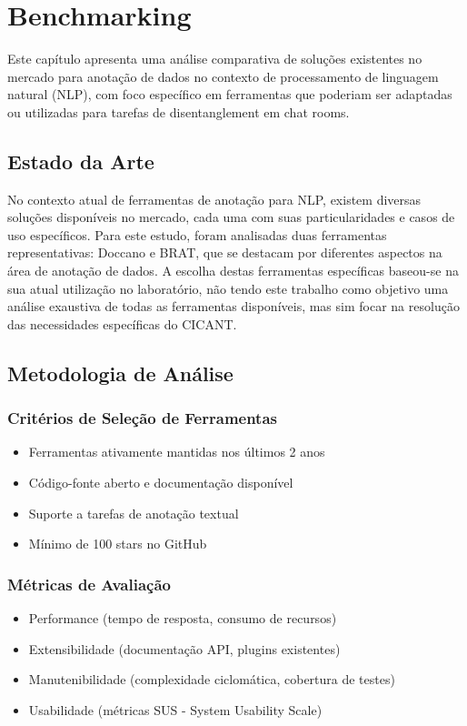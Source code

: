 \chapter{Benchmarking}

Este capítulo apresenta uma análise comparativa de soluções existentes no mercado para anotação de dados no contexto de processamento de linguagem natural (NLP), com foco específico em ferramentas que poderiam ser adaptadas ou utilizadas para tarefas de disentanglement em chat rooms.

\section{Estado da Arte}

No contexto atual de ferramentas de anotação para NLP, existem diversas soluções disponíveis no mercado, cada uma com suas particularidades e casos de uso específicos. Para este estudo, foram analisadas duas ferramentas representativas: Doccano e BRAT, que se destacam por diferentes aspectos na área de anotação de dados. A escolha destas ferramentas específicas baseou-se na sua atual utilização no laboratório, não tendo este trabalho como objetivo uma análise exaustiva de todas as ferramentas disponíveis, mas sim focar na resolução das necessidades específicas do CICANT.

\section{Metodologia de Análise}

\subsection{Critérios de Seleção de Ferramentas}
\begin{itemize}
    \item Ferramentas ativamente mantidas nos últimos 2 anos
    \item Código-fonte aberto e documentação disponível
    \item Suporte a tarefas de anotação textual
    \item Mínimo de 100 stars no GitHub
\end{itemize}

\subsection{Métricas de Avaliação}
\begin{itemize}
    \item Performance (tempo de resposta, consumo de recursos)
    \item Extensibilidade (documentação API, plugins existentes)
    \item Manutenibilidade (complexidade ciclomática, cobertura de testes)
    \item Usabilidade (métricas SUS - System Usability Scale)
\end{itemize}

